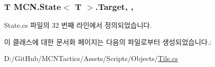 \subsubsection[{\texorpdfstring{Target}{Target}}]{\setlength{\rightskip}{0pt plus 5cm}T {\bf M\+C\+N.\+State}$<$ T $>$.Target\hspace{0.3cm}{\ttfamily [get]}, {\ttfamily [protected]}, {\ttfamily [inherited]}}\hypertarget{class_m_c_n_1_1_state_a93ba2fd920292031bd6e65b1dc505cb3}{}\label{class_m_c_n_1_1_state_a93ba2fd920292031bd6e65b1dc505cb3}


State.\+cs 파일의 32 번째 라인에서 정의되었습니다.



이 클래스에 대한 문서화 페이지는 다음의 파일로부터 생성되었습니다.\+:\begin{DoxyCompactItemize}
\item 
D\+:/\+Git\+Hub/\+M\+C\+N\+Tactics/\+Assets/\+Scripts/\+Objects/\hyperlink{_tile_8cs}{Tile.\+cs}\end{DoxyCompactItemize}
